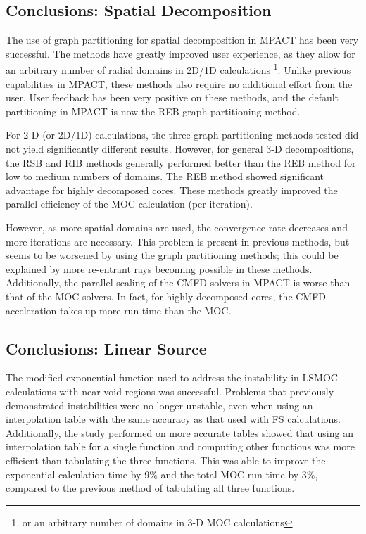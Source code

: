 {{    \subsection{Conclusions: Spatial Decomposition}{\label{ssec:Conclusions:Spatial Decomposition}
      The use of graph partitioning for spatial decomposition in MPACT has been very successful.
      The methods have greatly improved user experience, as they allow for an arbitrary number of radial domains in 2D/1D calculations \footnote{or an arbitrary number of domains in 3-D \ac{MOC} calculations}.
      Unlike previous capabilities in MPACT, these methods also require no additional effort from the user.
      User feedback has been very positive on these methods, and the default partitioning in MPACT is now the \ac{REB} graph partitioning method.

      For 2-D (or 2D/1D) calculations, the three graph partitioning methods tested did not yield significantly different results.
      However, for general 3-D decompositions, the \ac{RSB} and \ac{RIB} methods generally performed better than the \ac{REB} method for low to medium numbers of domains.
      The \ac{REB} method showed significant advantage for highly decomposed cores.
      These methods greatly improved the parallel efficiency of the \ac{MOC} calculation (per iteration).

      However, as more spatial domains are used, the convergence rate decreases and more iterations are necessary.
      This problem is present in previous methods, but seems to be worsened by using the graph partitioning methods; this could be explained by more re-entrant rays becoming possible in these methods.
      Additionally, the parallel scaling of the \ac{CMFD} solvers in MPACT is worse than that of the \ac{MOC} solvers.
      In fact, for highly decomposed cores, the \ac{CMFD} acceleration takes up more run-time than the \ac{MOC}.
    }

    \subsection{Conclusions: Linear Source}{\label{ssec:Conclusions:Linear Source}
      The modified exponential function used to address the instability in \ac{LSMOC} calculations with near-void regions was successful.
      Problems that previously demonstrated instabilities were no longer unstable, even when using an interpolation table with the same accuracy as that used with \ac{FS} calculations.
      Additionally, the study performed on more accurate tables showed that using an interpolation table for a single function and computing other functions was more efficient than tabulating the three functions.
      This was able to improve the exponential calculation time by 9\% and the total \ac{MOC} run-time by 3\%, compared to the previous method of tabulating all three functions.

}}}
